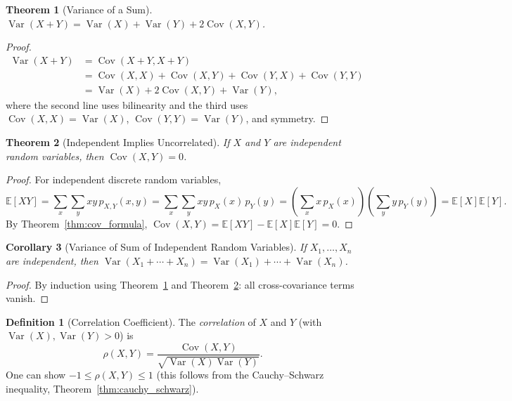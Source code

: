 \documentclass[11pt,a4paper]{article}
\theoremstyle{definition}
\newtheorem{definition}{Definition}[section]
\theoremstyle{plain}
\newtheorem{theorem}{Theorem}[section]
\newtheorem{corollary}[theorem]{Corollary}
\theoremstyle{remark}
\newcommand{\E}{\mathbb{E}}
\DeclareMathOperator{\Var}{Var}
\DeclareMathOperator{\Cov}{Cov}
\begin{document}
\begin{theorem}[Variance of a Sum]
\label{thm:var_sum}
$\Var(X + Y) = \Var(X) + \Var(Y) + 2\Cov(X,Y)$.
\end{theorem}

\begin{proof}
\begin{align*}
    \Var(X + Y) &= \Cov(X + Y, X + Y) \\
    &= \Cov(X, X) + \Cov(X, Y) + \Cov(Y, X) + \Cov(Y, Y) \\
    &= \Var(X) + 2\Cov(X, Y) + \Var(Y),
\end{align*}
where the second line uses bilinearity and the third uses
$\Cov(X,X) = \Var(X)$, $\Cov(Y,Y) = \Var(Y)$, and symmetry.
\end{proof}

\begin{theorem}[Independent Implies Uncorrelated]
\label{thm:indep_uncorr}
If $X$ and $Y$ are independent random variables, then $\Cov(X,Y) = 0$.
\end{theorem}

\begin{proof}
For independent discrete random variables,
\[
    \E[XY] = \sum_x \sum_y xy\,p_{X,Y}(x,y) = \sum_x \sum_y xy\,p_X(x)\,p_Y(y)
    = \left(\sum_x x\,p_X(x)\right)\!\left(\sum_y y\,p_Y(y)\right) = \E[X]\E[Y].
\]
By Theorem~\ref{thm:cov_formula}, $\Cov(X,Y) = \E[XY] - \E[X]\E[Y] = 0$.
\end{proof}

\begin{corollary}[Variance of Sum of Independent Random Variables]
\label{cor:var_indep_sum}
If $X_1, \ldots, X_n$ are independent, then $\Var(X_1 + \cdots + X_n) = \Var(X_1) + \cdots + \Var(X_n)$.
\end{corollary}

\begin{proof}
By induction using Theorem~\ref{thm:var_sum} and Theorem~\ref{thm:indep_uncorr}: all
cross-covariance terms vanish.
\end{proof}

\begin{definition}[Correlation Coefficient]
\label{def:correlation}
The \emph{correlation} of $X$ and $Y$ (with $\Var(X), \Var(Y) > 0$) is
\[
    \rho(X,Y) = \frac{\Cov(X,Y)}{\sqrt{\Var(X)\Var(Y)}}.
\]
One can show $-1 \leq \rho(X,Y) \leq 1$ (this follows from the Cauchy--Schwarz inequality,
Theorem~\ref{thm:cauchy_schwarz}).
\end{definition}
\end{document}
